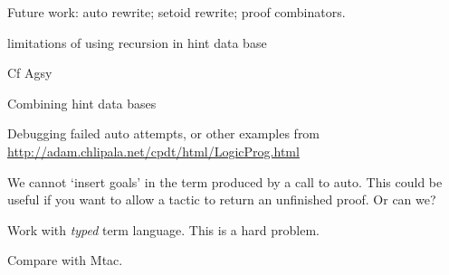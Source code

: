 \documentclass[preprint]{sigplanconf}
\begin{document}
Future work: auto rewrite; setoid rewrite; proof combinators.

limitations of using recursion in hint data base

Cf Agsy



Combining hint data bases

Debugging failed auto attempts, or other examples from
\url{http://adam.chlipala.net/cpdt/html/LogicProg.html}

We cannot `insert goals' in the term produced by a call to auto. This
could be useful if you want to allow a tactic to return an unfinished
proof. Or can we?

Work with \emph{typed} term language. This is a hard problem.

Compare with Mtac.



\end{document}

